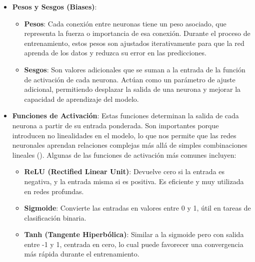 \documentclass[11pt]{article} %
\begin{document}
\begin{itemize}
   \item\textbf{Pesos y Sesgos (Biases)}:
    \begin{itemize}
        \item \textbf{Pesos}: Cada conexión entre neuronas tiene un peso asociado, que representa la fuerza o importancia de esa conexión. Durante el proceso de entrenamiento, estos pesos son ajustados iterativamente para que la red aprenda de los datos y reduzca su error en las predicciones.
        \item \textbf{Sesgos}: Son valores adicionales que se suman a la entrada de la función de activación de cada neurona. Actúan como un parámetro de ajuste adicional, permitiendo desplazar la salida de una neurona y mejorar la capacidad de aprendizaje del modelo.
    \end{itemize}
    \item \textbf{Funciones de Activación}: Estas funciones determinan la salida de cada neurona a partir de su entrada ponderada. Son importantes porque introducen no linealidades en el modelo, lo que nos permite que las redes neuronales aprendan relaciones complejas más allá de simples combinaciones lineales (\cite{datacamp_redes}). Algunas de las funciones de activación más comunes incluyen:
    \begin{itemize}
        \item \textbf{ReLU (Rectified Linear Unit)}: Devuelve cero si la entrada es negativa, y la entrada misma si es positiva. Es eficiente y muy utilizada en redes profundas.
        \item \textbf{Sigmoide}: Convierte las entradas en valores entre 0 y 1, útil en tareas de clasificación binaria. 
        \item \textbf{Tanh (Tangente Hiperbólica)}: Similar a la sigmoide pero con salida entre -1 y 1, centrada en cero, lo cual puede favorecer una convergencia más rápida durante el entrenamiento.
    \end{itemize}
\end{itemize}
\end{document}
